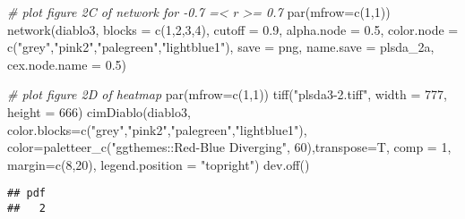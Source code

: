 \documentclass[
]{article}
\newenvironment{Shaded}{\begin{snugshade}}{\end{snugshade}}
\newcommand{\AttributeTok}[1]{\textcolor[rgb]{0.77,0.63,0.00}{#1}}
\newcommand{\CommentTok}[1]{\textcolor[rgb]{0.56,0.35,0.01}{\textit{#1}}}
\newcommand{\DecValTok}[1]{\textcolor[rgb]{0.00,0.00,0.81}{#1}}
\newcommand{\FloatTok}[1]{\textcolor[rgb]{0.00,0.00,0.81}{#1}}
\newcommand{\FunctionTok}[1]{\textcolor[rgb]{0.00,0.00,0.00}{#1}}
\newcommand{\NormalTok}[1]{#1}
\newcommand{\StringTok}[1]{\textcolor[rgb]{0.31,0.60,0.02}{#1}}
\begin{document}
\begin{Shaded}
\begin{Highlighting}[]
\CommentTok{\# plot figure 2C of network for {-}0.7 =\textless{} r \textgreater{}= 0.7}
\FunctionTok{par}\NormalTok{(}\AttributeTok{mfrow=}\FunctionTok{c}\NormalTok{(}\DecValTok{1}\NormalTok{,}\DecValTok{1}\NormalTok{))}
\FunctionTok{network}\NormalTok{(diablo3, }\AttributeTok{blocks =} \FunctionTok{c}\NormalTok{(}\DecValTok{1}\NormalTok{,}\DecValTok{2}\NormalTok{,}\DecValTok{3}\NormalTok{,}\DecValTok{4}\NormalTok{), }\AttributeTok{cutoff =} \FloatTok{0.9}\NormalTok{, }\AttributeTok{alpha.node =} \FloatTok{0.5}\NormalTok{,}
        \AttributeTok{color.node =} \FunctionTok{c}\NormalTok{(}\StringTok{"grey"}\NormalTok{,}\StringTok{"pink2"}\NormalTok{,}\StringTok{"palegreen"}\NormalTok{,}\StringTok{"lightblue1"}\NormalTok{), }
        \AttributeTok{save =} \StringTok{\textquotesingle{}png\textquotesingle{}}\NormalTok{, }\AttributeTok{name.save =} \StringTok{\textquotesingle{}plsda\_2a\textquotesingle{}}\NormalTok{, }\AttributeTok{cex.node.name =} \FloatTok{0.5}\NormalTok{)}

\CommentTok{\# plot figure 2D of heatmap}
\FunctionTok{par}\NormalTok{(}\AttributeTok{mfrow=}\FunctionTok{c}\NormalTok{(}\DecValTok{1}\NormalTok{,}\DecValTok{1}\NormalTok{))}
\FunctionTok{tiff}\NormalTok{(}\StringTok{"plsda3{-}2.tiff"}\NormalTok{, }\AttributeTok{width =} \DecValTok{777}\NormalTok{, }\AttributeTok{height =} \DecValTok{666}\NormalTok{)}
\FunctionTok{cimDiablo}\NormalTok{(diablo3, }\AttributeTok{color.blocks=}\FunctionTok{c}\NormalTok{(}\StringTok{"grey"}\NormalTok{,}\StringTok{"pink2"}\NormalTok{,}\StringTok{"palegreen"}\NormalTok{,}\StringTok{"lightblue1"}\NormalTok{),}
          \AttributeTok{color=}\FunctionTok{paletteer\_c}\NormalTok{(}\StringTok{"ggthemes::Red{-}Blue Diverging"}\NormalTok{, }\DecValTok{60}\NormalTok{),}\AttributeTok{transpose=}\NormalTok{T,}
          \AttributeTok{comp =} \DecValTok{1}\NormalTok{, }\AttributeTok{margin=}\FunctionTok{c}\NormalTok{(}\DecValTok{8}\NormalTok{,}\DecValTok{20}\NormalTok{), }\AttributeTok{legend.position =} \StringTok{"topright"}\NormalTok{)}
\FunctionTok{dev.off}\NormalTok{()}
\end{Highlighting}
\end{Shaded}

\begin{verbatim}
## pdf 
##   2
\end{verbatim}
\end{document}
